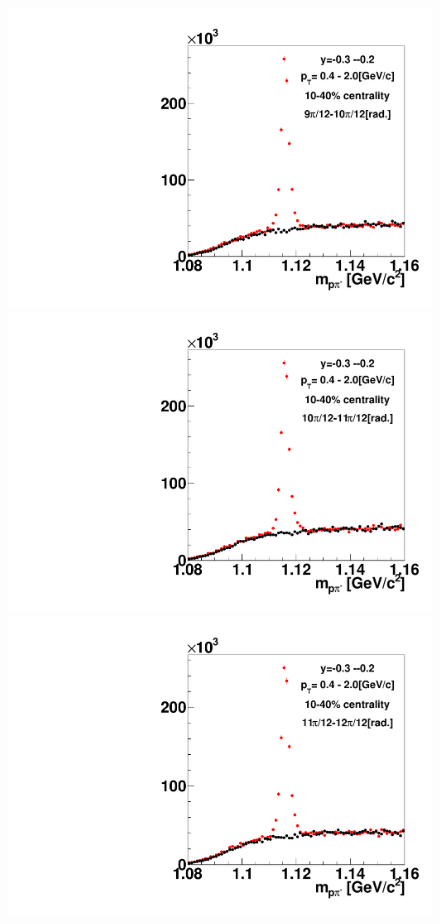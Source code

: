 \begin{figure}[h]
\includegraphics[width=0.14\linewidth]{chapterX/fig/ld_v1_sig/kf_ptslice0_cent1_ld_flow_phi10_rap7_check.pdf}
\includegraphics[width=0.14\linewidth]{chapterX/fig/ld_v1_sig/kf_ptslice0_cent1_ld_flow_phi11_rap7_check.pdf}
\includegraphics[width=0.14\linewidth]{chapterX/fig/ld_v1_sig/kf_ptslice0_cent1_ld_flow_phi12_rap7_check.pdf}


\end{figure}

